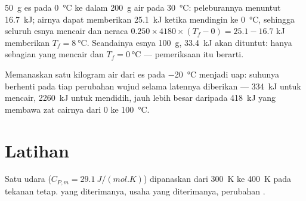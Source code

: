 \begin{example}\label{ex:b1:first-law:ice}
\qty{50}{g} es pada \qty{0}{\degreeCelsius} ke dalam \qty{200}{g} air pada
\qty{30}{\degreeCelsius}: peleburannya menuntut \qty{16.7}{kJ}; airnya dapat memberikan
\qty{25.1}{kJ} ketika mendingin ke \qty{0}{\degreeCelsius}, sehingga seluruh esnya mencair
dan neraca $0.250 \times 4180 \times (T_f - 0) = 25.1 - 16.7$ kJ memberikan
$T_f = \qty{8}{\degreeCelsius}$. Seandainya esnya \qty{100}{g},
\qty{33.4}{kJ} akan dituntut: hanya sebagian yang mencair dan $T_f = \qty{0}{\degreeCelsius}$
--- pemeriksaan itu berarti.
\end{example}

\begin{omfigure}

{\small Memanaskan satu kilogram air dari es pada \qty{-20}{\degreeCelsius}
menjadi uap: suhunya berhenti pada tiap perubahan wujud selama
 latennya diberikan --- \qty{334}{kJ} untuk mencair, \qty{2260}{kJ} untuk mendidih,
jauh lebih besar daripada \qty{418}{kJ} yang membawa zat cairnya dari \qty{0}{} ke
\qty{100}{\degreeCelsius}.}
\end{omfigure}

\section{Latihan}

\begin{exercise}[$\star$]\label{exo:b1:first-law:1}
Satu  udara ($C_{P,m} = \qty{29.1}{J/(mol.K)}$) dipanaskan dari
\qty{300}{K} ke \qty{400}{K} pada tekanan tetap.  yang diterimanya, usaha
yang diterimanya, perubahan .
\end{exercise}

